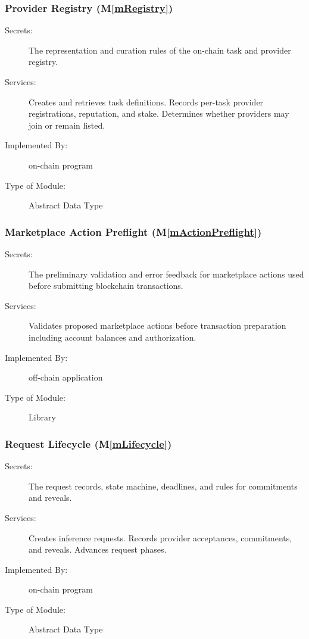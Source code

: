 \documentclass[12pt, titlepage]{article}
\newcommand{\mref}[1]{M\ref{#1}}
\begin{document}
\subsubsection{Provider Registry (\mref{mRegistry})}

\begin{description}
\item[Secrets:] The representation and curation rules of the on-chain task
  and provider registry.
\item[Services:] Creates and retrieves task definitions. Records per-task
  provider registrations, reputation, and stake. Determines whether providers may join or remain listed.
\item[Implemented By:] \progname{} on-chain program
\item[Type of Module:] Abstract Data Type
\end{description}

\subsubsection{Marketplace Action Preflight (\mref{mActionPreflight})}

\begin{description}
\item[Secrets:] The preliminary validation and error feedback for marketplace
  actions used before submitting blockchain transactions.
\item[Services:] Validates proposed marketplace actions before
  transaction preparation including account balances and authorization.
\item[Implemented By:] \progname{} off-chain application
\item[Type of Module:] Library
\end{description}

\subsubsection{Request Lifecycle (\mref{mLifecycle})}

\begin{description}
\item[Secrets:] The request records, state machine, deadlines, and rules for
  commitments and reveals.
\item[Services:] Creates inference requests. Records provider acceptances,
  commitments, and reveals. Advances request phases.
\item[Implemented By:] \progname{} on-chain program
\item[Type of Module:] Abstract Data Type
\end{description}
\end{document}
